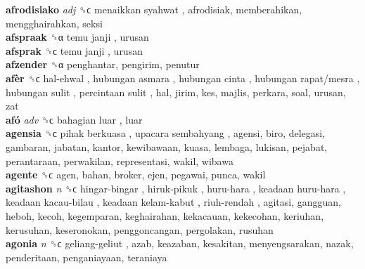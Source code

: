\textbf{afrodisiako} \emph{adj}  ␝ϲ   menaikkan syahwat , afrodisiak, memberahikan, mengghairahkan, seksi  \\
\textbf{afspraak} ␝α   temu janji , urusan  \\
\textbf{afsprak} ␝ϲ   temu janji , urusan  \\
\textbf{afzender} ␝α  penghantar, pengirim, penutur  \\
\textbf{afèr} ␝ϲ   hal-ehwal ,  hubungan asmara ,  hubungan cinta ,  hubungan rapat/mesra ,  hubungan sulit ,  percintaan sulit , hal, jirim, kes, majlis, perkara, soal, urusan, zat  \\
\textbf{afó} \emph{adv}  ␝ϲ   bahagian luar , luar  \\
\textbf{agensia} ␝ϲ   pihak berkuasa ,  upacara sembahyang , agensi, biro, delegasi, gambaran, jabatan, kantor, kewibawaan, kuasa, lembaga, lukisan, pejabat, perantaraan, perwakilan, representasi, wakil, wibawa  \\
\textbf{agente} ␝ϲ  agen, bahan, broker, ejen, pegawai, punca, wakil  \\
\textbf{agitashon} \emph{n}  ␝ϲ   hingar-bingar ,  hiruk-pikuk ,  huru-hara ,  keadaan huru-hara ,  keadaan kacau-bilau ,  keadaan kelam-kabut ,  riuh-rendah , agitasi, gangguan, heboh, kecoh, kegemparan, keghairahan, kekacauan, kekecohan, keriuhan, kerusuhan, keseronokan, penggoncangan, pergolakan, rusuhan  \\
\textbf{agonia} \emph{n}  ␝ϲ   geliang-geliut , azab, keazaban, kesakitan, menyengsarakan, nazak, penderitaan, penganiayaan, teraniaya  \\
